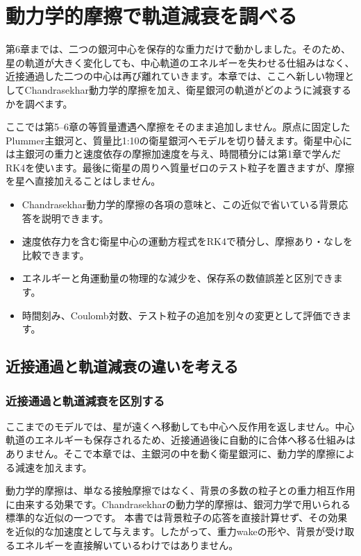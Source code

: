 \chapter{動力学的摩擦で軌道減衰を調べる}
\label{chap:dynamical-friction}
第6章までは、二つの銀河中心を保存的な重力だけで動かしました。そのため、星の軌道が大きく変化しても、中心軌道のエネルギーを失わせる仕組みはなく、近接通過した二つの中心は再び離れていきます。本章では、ここへ新しい物理としてChandrasekhar動力学的摩擦を加え、衛星銀河の軌道がどのように減衰するかを調べます。

ここでは第5--6章の等質量遭遇へ摩擦をそのまま追加しません。原点に固定したPlummer主銀河と、質量比1:10の衛星銀河へモデルを切り替えます。衛星中心には主銀河の重力と速度依存の摩擦加速度を与え、時間積分には第1章で学んだRK4を使います。最後に衛星の周りへ質量ゼロのテスト粒子を置きますが、摩擦を星へ直接加えることはしません。

\begin{goalbox}[この章で学ぶこと]
\begin{itemize}
\item Chandrasekhar動力学的摩擦の各項の意味と、この近似で省いている背景応答を説明できます。
\item 速度依存力を含む衛星中心の運動方程式をRK4で積分し、摩擦あり・なしを比較できます。
\item エネルギーと角運動量の物理的な減少を、保存系の数値誤差と区別できます。
\item 時間刻み、Coulomb対数、テスト粒子の追加を別々の変更として評価できます。
\end{itemize}
\end{goalbox}

\section{近接通過と軌道減衰の違いを考える}
\label{sec:ch7-model}
\subsection{近接通過と軌道減衰を区別する}
ここまでのモデルでは、星が遠くへ移動しても中心へ反作用を返しません。中心軌道のエネルギーも保存されるため、近接通過後に自動的に合体へ移る仕組みはありません。そこで本章では、主銀河の中を動く衛星銀河に、動力学的摩擦による減速を加えます。

動力学的摩擦は、単なる接触摩擦ではなく、背景の多数の粒子との重力相互作用に由来する効果です。Chandrasekharの動力学的摩擦は、銀河力学で用いられる標準的な近似の一つです。\cite{bt2008} 本書では背景粒子の応答を直接計算せず、その効果を近似的な加速度として与えます。したがって、重力wakeの形や、背景が受け取るエネルギーを直接解いているわけではありません。

